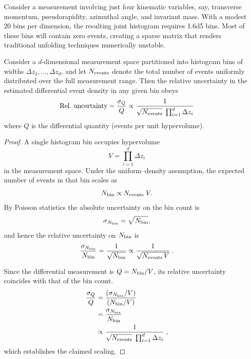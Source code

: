             Consider a measurement involving just four kinematic variables, say, transverse momentum, pseudorapidity, azimuthal angle, and invariant mass.
            With a modest 20 bins per dimension, the resulting joint histogram requires \num{1.6d5} bins.
            Most of these bins will contain zero events, creating a sparse matrix that renders traditional unfolding techniques numerically unstable.
            
            \begin{proposition}
                \label{prop:relative-uncertainty}
                Consider a \(d\)-dimensional measurement space partitioned into histogram bins of widths \(\Delta z_1,\dots,\Delta z_d\), and let \(N_{\rm events}\) denote the total number of events uniformly distributed over the full measurement range.
                Then the relative uncertainty in the estimated differential event density in any given bin obeys
                \begin{equation}
                    \text{Rel.\ uncertainty} = \frac{\sigma_{Q}}{Q} \propto \frac{1}{\sqrt{N_{\rm events}}\;\prod_{i=1}^d\Delta z_i}
                \end{equation}
                where \(Q\) is the differential quantity (events per unit hypervolume).
            \end{proposition}
                
            \begin{proof}
                A single histogram bin occupies hypervolume
                \[
                    V = \prod_{i=1}^d \Delta z_i
                \]
                in the measurement space.
                Under the uniform--density assumption, the expected number of events in that bin scales as
                \[
                    N_{\rm bin} \propto N_{\rm events}\;V.
                \]
                By Poisson statistics the absolute uncertainty on the bin count is
                \[
                    \sigma_{N_{\rm bin}} = \sqrt{N_{\rm bin}},
                \]
                and hence the relative uncertainty on \(N_{\rm bin}\) is
                \[
                    \frac{\sigma_{N_{\rm bin}}}{N_{\rm bin}} = \frac{1}{\sqrt{N_{\rm bin}}} \propto \frac{1}{\sqrt{N_{\rm events}\,V}}\;.
                \]
                
                Since the differential measurement is \(Q = N_{\rm bin}/V\), its relative uncertainty coincides with that of the bin count.
                \begin{align}
                    \frac{\sigma_Q}{Q} &= \frac{(\sigma_{N_{\rm bin}}/V)}{(N_{\rm bin}/V)} \\
                    &= \frac{\sigma_{N_{\rm bin}}}{N_{\rm bin}} \\
                    &\propto \frac{1}{\sqrt{N_{\rm events}}\;\prod_{i=1}^d\Delta z_i}\;,
                \end{align}
                which establishes the claimed scaling.
            \end{proof}
            
